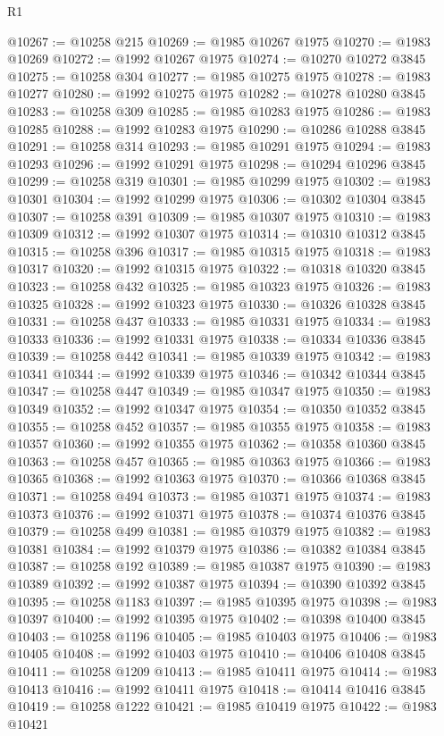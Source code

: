\begin{lexlean}{R1}
\begin{coremodule}
@10267 := @10258 @215
@10269 := @1985 @10267 @1975
@10270 := @1983 @10269
@10272 := @1992 @10267 @1975
@10274 := @10270 @10272 @3845
@10275 := @10258 @304
@10277 := @1985 @10275 @1975
@10278 := @1983 @10277
@10280 := @1992 @10275 @1975
@10282 := @10278 @10280 @3845
@10283 := @10258 @309
@10285 := @1985 @10283 @1975
@10286 := @1983 @10285
@10288 := @1992 @10283 @1975
@10290 := @10286 @10288 @3845
@10291 := @10258 @314
@10293 := @1985 @10291 @1975
@10294 := @1983 @10293
@10296 := @1992 @10291 @1975
@10298 := @10294 @10296 @3845
@10299 := @10258 @319
@10301 := @1985 @10299 @1975
@10302 := @1983 @10301
@10304 := @1992 @10299 @1975
@10306 := @10302 @10304 @3845
@10307 := @10258 @391
@10309 := @1985 @10307 @1975
@10310 := @1983 @10309
@10312 := @1992 @10307 @1975
@10314 := @10310 @10312 @3845
@10315 := @10258 @396
@10317 := @1985 @10315 @1975
@10318 := @1983 @10317
@10320 := @1992 @10315 @1975
@10322 := @10318 @10320 @3845
@10323 := @10258 @432
@10325 := @1985 @10323 @1975
@10326 := @1983 @10325
@10328 := @1992 @10323 @1975
@10330 := @10326 @10328 @3845
@10331 := @10258 @437
@10333 := @1985 @10331 @1975
@10334 := @1983 @10333
@10336 := @1992 @10331 @1975
@10338 := @10334 @10336 @3845
@10339 := @10258 @442
@10341 := @1985 @10339 @1975
@10342 := @1983 @10341
@10344 := @1992 @10339 @1975
@10346 := @10342 @10344 @3845
@10347 := @10258 @447
@10349 := @1985 @10347 @1975
@10350 := @1983 @10349
@10352 := @1992 @10347 @1975
@10354 := @10350 @10352 @3845
@10355 := @10258 @452
@10357 := @1985 @10355 @1975
@10358 := @1983 @10357
@10360 := @1992 @10355 @1975
@10362 := @10358 @10360 @3845
@10363 := @10258 @457
@10365 := @1985 @10363 @1975
@10366 := @1983 @10365
@10368 := @1992 @10363 @1975
@10370 := @10366 @10368 @3845
@10371 := @10258 @494
@10373 := @1985 @10371 @1975
@10374 := @1983 @10373
@10376 := @1992 @10371 @1975
@10378 := @10374 @10376 @3845
@10379 := @10258 @499
@10381 := @1985 @10379 @1975
@10382 := @1983 @10381
@10384 := @1992 @10379 @1975
@10386 := @10382 @10384 @3845
@10387 := @10258 @192
@10389 := @1985 @10387 @1975
@10390 := @1983 @10389
@10392 := @1992 @10387 @1975
@10394 := @10390 @10392 @3845
@10395 := @10258 @1183
@10397 := @1985 @10395 @1975
@10398 := @1983 @10397
@10400 := @1992 @10395 @1975
@10402 := @10398 @10400 @3845
@10403 := @10258 @1196
@10405 := @1985 @10403 @1975
@10406 := @1983 @10405
@10408 := @1992 @10403 @1975
@10410 := @10406 @10408 @3845
@10411 := @10258 @1209
@10413 := @1985 @10411 @1975
@10414 := @1983 @10413
@10416 := @1992 @10411 @1975
@10418 := @10414 @10416 @3845
@10419 := @10258 @1222
@10421 := @1985 @10419 @1975
@10422 := @1983 @10421

\end{coremodule}
\end{lexlean}
